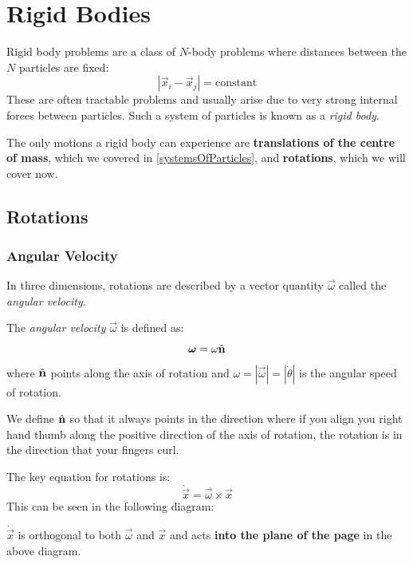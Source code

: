 \documentclass[../main.tex]{subfiles}
\begin{document}
\chapter{Rigid Bodies}
Rigid body problems are a class of $N$-body problems where distances between the $N$ particles are fixed:
\[
  |\vec{x}_i - \vec{x}_j| = \text{constant}
\]
These are often tractable problems and usually arise due to very strong internal forces between particles.
Such a system of particles is known as a \textit{rigid body}.

The only motions a rigid body can experience are \textbf{translations of the centre of mass}, which we covered in \cref{systemsOfParticles}, and \textbf{rotations}, which we will cover now.
\section{Rotations}
\label{rigidRotations}
\subsection{Angular Velocity}
In three dimensions, rotations are described by a vector quantity $\vec{\omega}$ called the \textit{angular velocity}.
\begin{definition}
  The \textit{angular velocity} $\vec{\omega}$ is defined as:
  \[
    \mathbf{\bm{\omega}} = \omega \hat{\mathbf{\bm{n}}}
  \]
  where $\hat{\mathbf{\bm{n}}}$ points along the axis of rotation and $\omega = |\vec{\omega}| = |\dot{\theta}|$ is the angular speed of rotation.
\end{definition}
\begin{remark}
  We define $\hat{\mathbf{\bm{n}}}$ so that it always points in the direction where if you align you right hand thumb along the positive direction of the axis of rotation, the rotation is in the direction that your fingers curl.
\end{remark}
The key equation for rotations is:
\begin{equation}
  \dot{\vec{x}} = \vec{\omega} \times \vec{x} \label{angularVelocityCross}
\end{equation}
This can be seen in the following diagram:
\begin{center}
\end{center}
$\dot{\vec{x}}$ is orthogonal to both $\vec{\omega}$ and $\vec{x}$ and acts \textbf{into the plane of the page} in the above diagram.
\end{document}
